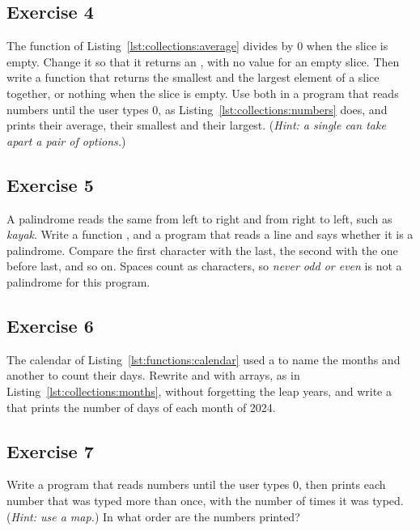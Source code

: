 \subsection*{Exercise 4}

The function  of Listing~\ref{lst:collections:average} divides by
0 when the slice is empty. Change it so that it returns an , with no
value for an empty slice. Then write a function  that returns the
smallest and the largest element of a slice together, or nothing when the slice
is empty. Use both in a program that reads numbers until the user types 0, as
Listing~\ref{lst:collections:numbers} does, and prints their average, their
smallest and their largest. (\textit{Hint: a single  can take apart
a pair of options.})

\subsection*{Exercise 5}

A palindrome reads the same from left to right and from right to left, such as
\textit{kayak}. Write a function , and a
program that reads a line and says whether it is a palindrome. Compare the first
character with the last, the second with the one before last, and so on. Spaces
count as characters, so \textit{never odd or even} is not a palindrome for this
program.

\subsection*{Exercise 6}

The calendar of Listing~\ref{lst:functions:calendar} used a  to
name the months and another to count their days. Rewrite  and
 with arrays, as in
Listing~\ref{lst:collections:months}, without forgetting the leap years, and
write a  that prints the number of days of each month of 2024.

\subsection*{Exercise 7}

Write a program that reads numbers until the user types 0, then prints each
number that was typed more than once, with the number of times it was typed.
(\textit{Hint: use a map.}) In what order are the numbers printed?

